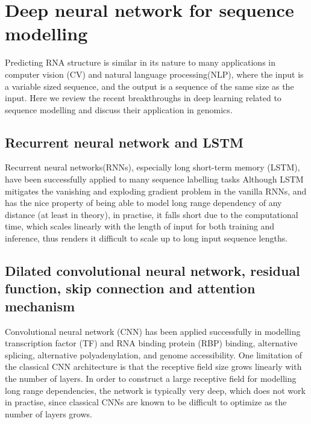 \documentclass{proposal}
\begin{document}
\section{Deep neural network for sequence modelling}

Predicting RNA structure is similar in its nature to many applications in
computer vision (CV) and natural language processing(NLP),
where the input is a variable sized sequence,
and the output is a sequence of the same size as the input.
Here we review the recent breakthroughs in deep learning related to sequence modelling and discuss their application in genomics.


\subsection*{Recurrent neural network and LSTM}

Recurrent neural networks(RNNs), especially long short-term memory (LSTM)\cite{hochreiter1997long},
have been successfully applied to many sequence labelling tasks
Although LSTM mitigates the vanishing and exploding gradient problem in the vanilla RNNs,
and has the nice property of being able to model long range dependency of any distance (at least in theory),
in practise, it falls short due to the computational time,
which scales linearly with the length of input for both training and inference,
thus renders it difficult to scale up to long input sequence lengths.

\subsection*{Dilated convolutional neural network, residual function, skip connection and attention mechanism}


Convolutional neural network (CNN) has been applied successfully in
modelling transcription factor (TF) and RNA binding protein (RBP) binding\cite{alipanahi2015predicting, gandhi2018cdeepbind},
alternative splicing\cite{bretschneider2018cossmo}, alternative polyadenylation\cite{leung2018inference},
and genome accessibility\cite{kelley2016basset}.
One limitation of the classical CNN architecture is that the receptive field size grows linearly with the number of
layers. In order to construct a large receptive field for modelling long range dependencies,
the network is typically very deep, which does not work in practise,
since classical CNNs are known to be difficult to optimize as the number of layers grows.
\end{document}
